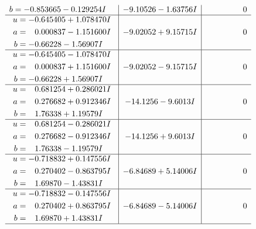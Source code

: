 \documentclass[1p]{elsarticle_modified}
\theoremstyle{definition}
\begin{document}
$$\begin{array}{c|c|c}
\begin{aligned}
b &= -0.853665 - 0.129254 I\end{aligned}
 & -9.10526 - 1.63756 I & \phantom{-0.000000 } 0 \\ \hline\begin{aligned}
u &= -0.645405 + 1.078470 I \\
a &= \phantom{-}0.000837 - 1.151600 I \\
b &= -0.66228 - 1.56907 I\end{aligned}
 & -9.02052 + 9.15715 I & \phantom{-0.000000 } 0 \\ \hline\begin{aligned}
u &= -0.645405 - 1.078470 I \\
a &= \phantom{-}0.000837 + 1.151600 I \\
b &= -0.66228 + 1.56907 I\end{aligned}
 & -9.02052 - 9.15715 I & \phantom{-0.000000 } 0 \\ \hline\begin{aligned}
u &= \phantom{-}0.681254 + 0.286021 I \\
a &= \phantom{-}0.276682 + 0.912346 I \\
b &= \phantom{-}1.76338 + 1.19579 I\end{aligned}
 & -14.1256 - 9.6013 I & \phantom{-0.000000 } 0 \\ \hline\begin{aligned}
u &= \phantom{-}0.681254 - 0.286021 I \\
a &= \phantom{-}0.276682 - 0.912346 I \\
b &= \phantom{-}1.76338 - 1.19579 I\end{aligned}
 & -14.1256 + 9.6013 I & \phantom{-0.000000 } 0 \\ \hline\begin{aligned}
u &= -0.718832 + 0.147556 I \\
a &= \phantom{-}0.270402 - 0.863795 I \\
b &= \phantom{-}1.69870 - 1.43831 I\end{aligned}
 & -6.84689 + 5.14006 I & \phantom{-0.000000 } 0 \\ \hline\begin{aligned}
u &= -0.718832 - 0.147556 I \\
a &= \phantom{-}0.270402 + 0.863795 I \\
b &= \phantom{-}1.69870 + 1.43831 I\end{aligned}
 & -6.84689 - 5.14006 I & \phantom{-0.000000 } 0\\
 \hline 
 \end{array}$$\newpage$$\begin{array}{c|c|c}  

\end{array}$$
\end{document}
